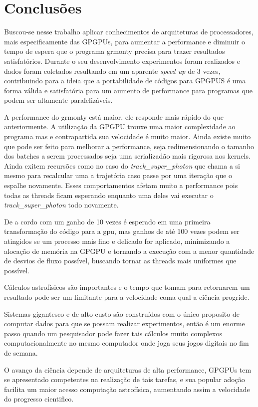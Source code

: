 \chapter{Conclusões}
\label{cap:conclusoes}

Buscou-se nesse trabalho aplicar conhecimentos de arquiteturas de processadores, mais especificamente das GPGPUs, para aumentar a performance e diminuir o tempo de espera que o programa grmonty precisa para trazer resultados satisfatórios. Durante o seu desenvolvimento experimentos foram realizados e dados foram coletados resultando em um aparente \textit{speed up} de 3 vezes, contribuindo para a ideia que a portabilidade de códigos para GPGPUS é uma forma válida e satisfatória para um aumento de performance para programas que podem ser altamente paralelizáveis.

A performance do grmonty está maior, ele responde mais rápido do que anteriormente. A utilização da GPGPU trouxe uma maior complexidade ao programa mas e contrapartida sua velocidade é muito maior. Ainda existe muito que pode ser feito para melhorar a performance, seja redimensionando o tamanho dos batches a serem processados seja uma serializadão mais rigorosa nos kernels. Ainda exitem recursões como no caso do \textit{track\_super\_photon} que chama a si mesmo para recalcular uma a trajetória caso passe por uma iteração que o espalhe novamente. Esses comportamentos afetam muito a performance pois todas as threads ficam esperando enquanto uma deles vai executar o \textit{track\_super\_photon} todo novamente.

De a cordo com \citep{massively:16} um ganho de 10 vezes é esperado em uma primeira transformação do código para a gpu, mas ganhos de até 100 vezes podem ser atingidos se um processo mais fino e delicado for aplicado, minimizando a alocação de memória na GPGPU e tornando a execução com a menor quantidade de desvios de fluxo possível, buscando tornar as threads mais uniformes que possível.

Cálculos astrofísicos são importantes e o tempo que tomam para retornarem um resultado pode ser um limitante para a velocidade coma qual a ciência progride.

Sistemas gigantesco e de alto custo são construídos com o único proposito de computar dados para que se possam realizar experimentos, então é um enorme passo quando um pesquisador pode fazer tais cálculos muito complexos computacionalmente no mesmo computador onde joga seus jogos digitais no fim de semana.

O avanço da ciência depende de arquiteturas de alta performance, GPGPUs tem se apresentado competentes na realização de tais tarefas, e sua popular adoção facilita um maior acesso computação astrofísica, aumentando assim a velocidade do progresso cientifico.
